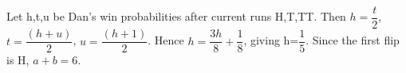 Let h,t,u be Dan's win probabilities after current runs H,T,TT. Then $h=\dfrac{t}{2}$, $t=\dfrac{(h+u)}{2}$, $u=\dfrac{(h+1)}{2}$. Hence $h=\dfrac{3h}{8}+\dfrac{1}{8}$, giving h=$\dfrac{1}{5}$. Since the first flip is H, $a+b=\boxed6$.
